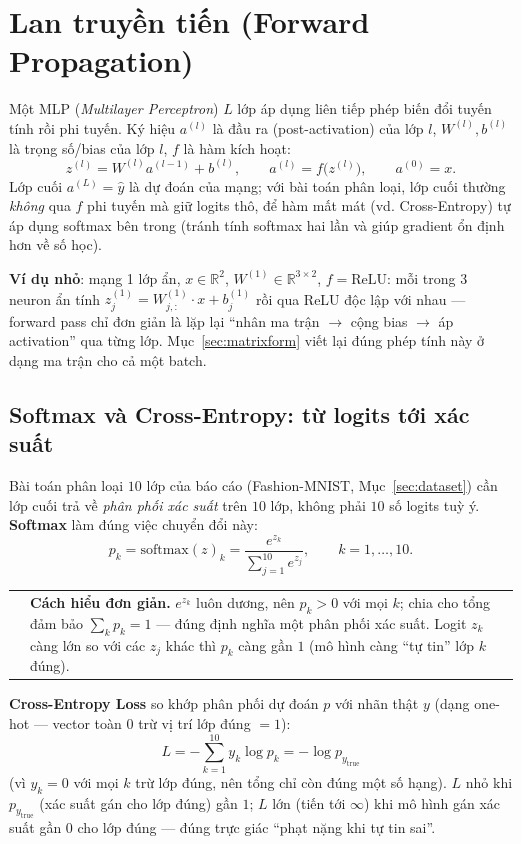 \documentclass[12pt,a4paper]{article}
\makeatletter
\newenvironment{tructiep}[1][Cách hiểu đơn giản]
  {\par\smallskip\noindent\begin{tabular}{@{}p{0.35em}@{\hspace{6pt}}p{\dimexpr\linewidth-1.9em\relax}@{}}
   \textcolor{boxln}{\rule{2pt}{\baselineskip}} & \textbf{#1.}\enspace\ignorespaces}
  {\end{tabular}\par\smallskip}
\newcommand{\en}[1]{\textit{#1}}
\makeatother
\begin{document}
\section{Lan truyền tiến (Forward Propagation)}
\label{sec:forward}

Một MLP (\en{Multilayer Perceptron}) $L$ lớp áp dụng liên tiếp phép biến
đổi tuyến tính rồi phi tuyến. Ký hiệu $a^{(l)}$ là đầu ra (post-activation)
của lớp $l$, $W^{(l)},b^{(l)}$ là trọng số/bias của lớp $l$, $f$ là hàm
kích hoạt:
$$z^{(l)} = W^{(l)}a^{(l-1)} + b^{(l)}, \qquad a^{(l)} = f\big(z^{(l)}\big), \qquad a^{(0)}=x.$$
Lớp cuối $a^{(L)}=\hat y$ là dự đoán của mạng; với bài toán phân loại, lớp
cuối thường \emph{không} qua $f$ phi tuyến mà giữ logits thô, để hàm mất
mát (vd. Cross-Entropy) tự áp dụng softmax bên trong (tránh tính softmax
hai lần và giúp gradient ổn định hơn về số học).

\textbf{Ví dụ nhỏ}: mạng 1 lớp ẩn, $x\in\mathbb R^2$,
$W^{(1)}\in\mathbb R^{3\times2}$, $f=\mathrm{ReLU}$: mỗi trong 3 neuron ẩn
tính $z^{(1)}_j = W^{(1)}_{j,:}\cdot x + b^{(1)}_j$ rồi qua ReLU độc lập
với nhau --- forward pass chỉ đơn giản là lặp lại ``nhân ma trận $\to$ cộng
bias $\to$ áp activation'' qua từng lớp. Mục~\ref{sec:matrixform} viết lại
đúng phép tính này ở dạng ma trận cho cả một batch.

\subsection{Softmax và Cross-Entropy: từ logits tới xác suất}
\label{sec:softmax}

Bài toán phân loại $10$ lớp của báo cáo (Fashion-MNIST, Mục~\ref{sec:dataset})
cần lớp cuối trả về \emph{phân phối xác suất} trên $10$ lớp, không phải
$10$ số logits tuỳ ý. \textbf{Softmax} làm đúng việc chuyển đổi này:
$$p_k = \mathrm{softmax}(z)_k = \frac{e^{z_k}}{\sum_{j=1}^{10} e^{z_j}}, \qquad k=1,\ldots,10.$$

\begin{tructiep}
$e^{z_k}$ luôn dương, nên $p_k>0$ với mọi $k$; chia cho tổng đảm bảo
$\sum_k p_k=1$ --- đúng định nghĩa một phân phối xác suất. Logit $z_k$
càng lớn so với các $z_j$ khác thì $p_k$ càng gần $1$ (mô hình càng ``tự
tin'' lớp $k$ đúng).
\end{tructiep}

\textbf{Cross-Entropy Loss} so khớp phân phối dự đoán $p$ với nhãn thật
$y$ (dạng one-hot --- vector toàn $0$ trừ vị trí lớp đúng $=1$):
$$L = -\sum_{k=1}^{10} y_k\log p_k = -\log p_{y_{\text{true}}}$$
(vì $y_k=0$ với mọi $k$ trừ lớp đúng, nên tổng chỉ còn đúng một số hạng).
$L$ nhỏ khi $p_{y_{\text{true}}}$ (xác suất gán cho lớp đúng) gần $1$; $L$
lớn (tiến tới $\infty$) khi mô hình gán xác suất gần $0$ cho lớp đúng ---
đúng trực giác ``phạt nặng khi tự tin sai''.
\end{document}
